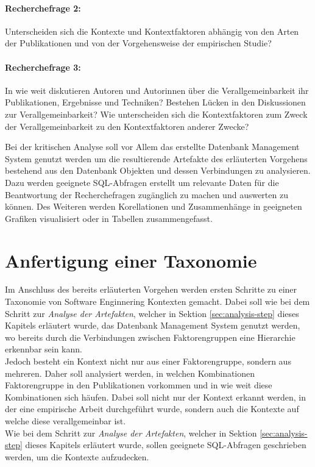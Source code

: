 \paragraph{Recherchefrage 2:} Unterscheiden sich die Kontexte und Kontextfaktoren abhängig von den Arten der Publikationen und von der Vorgehensweise der empirischen Studie?

\paragraph{Recherchefrage 3:} In wie weit diskutieren Autoren und Autorinnen über die Verallgemeinbarkeit ihr Publikationen, Ergebnisse und Techniken? Bestehen Lücken in den Diskussionen zur Verallgemeinbarkeit? Wie unterscheiden sich die Kontextfaktoren zum Zweck der Verallgemeinbarkeit zu den Kontextfaktoren anderer Zwecke? 

Bei der kritischen Analyse soll vor Allem das erstellte Datenbank Management System genutzt werden um die resultierende Artefakte des erläuterten Vorgehens bestehend aus den Datenbank Objekten und dessen Verbindungen zu analysieren. Dazu werden geeignete SQL-Abfragen erstellt um relevante Daten für die Beantwortung der Recherchefragen zugänglich zu machen und auswerten zu können. Des Weiteren werden Korellationen und Zusammenhänge in geeigneten Grafiken visualisiert oder in Tabellen zusammengefasst.

\section{Anfertigung einer Taxonomie}
Im Anschluss des bereits erläuterten Vorgehen werden ersten Schritte zu einer Taxonomie von Software Enginnering Kontexten gemacht. Dabei soll wie bei dem Schritt zur \textit{Analyse der Artefakten}, welcher in Sektion \ref{sec:analysis-step} dieses Kapitels erläutert wurde, das Datenbank Management System genutzt werden, wo bereits durch die Verbindungen zwischen Faktorengruppen eine Hierarchie erkennbar sein kann. \\

Jedoch besteht ein Kontext nicht nur aus einer Faktorengruppe, sondern aus mehreren. Daher soll analysiert werden, in welchen Kombinationen Faktorengruppe in den Publikationen vorkommen und in wie weit diese Kombinationen sich häufen. Dabei soll nicht nur der Kontext erkannt werden, in der eine empirische Arbeit durchgeführt wurde, sondern auch die Kontexte auf welche diese verallgemeinbar ist. \\
Wie bei dem Schritt zur \textit{Analyse der Artefakten}, welcher in Sektion \ref{sec:analysis-step} dieses Kapitels erläutert wurde, sollen geeignete SQL-Abfragen geschrieben werden, um die Kontexte aufzudecken.

